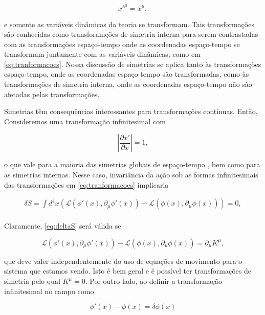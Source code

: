 \begin{equation}
x'^\mu = x^\mu , \label{eq:Xinvariante}
\end{equation}

e somente as variáveis dinâmicas da teoria se transformam. Tais transformações são conhecidas como transforamções de simetria interna para serem contrastadas com as transformações espaço-tempo onde as coordenadas espaço-tempo se transformam juntamente com as variáveis dinâmicas, como em \eqref{eq:tranformacoes}. Nossa discussão de simetrias se aplica tanto às transformações espaço-tempo, onde as coordenadas espaço-tempo são transformadas, como às transformações de simetria interna, onde as coordenadas espaço-tempo não são afetadas pelas transformações.

Simetrias têm consequências interessantes para transformações contínuas. Então, Consideremos uma transformação infinitesimal com

\begin{equation}
\left| \frac{\partial x'}{\partial x} \right| = 1, \label{eq:deXdevX}
\end{equation}

o que vale para a maioria das simetrias globais de espaço-tempo , bem como para as simetrias internas. Nesse caso, invariância da ação sob as formas infinitesimais das transformações em \eqref{eq:tranformacoes} implicaria

\begin{equation}
\begin{aligned}
\delta S = \int d^4 x ( \mathcal{L} (\phi' (x), \partial_\mu \phi' (x)) - \mathcal{L} (\phi (x), \partial_\mu \phi (x)) ) = 0, \\ \label{eq:deltaS}
\end{aligned}
\end{equation}

Claramente, \eqref{eq:deltaS} será válida se 

\begin{equation}
\mathcal{L} (\phi'(x), \partial_\mu \phi'(x)) - \mathcal{L} (\phi(x), \partial_\mu \phi(x)) = \partial_\mu K^\mu, \label{eq:deltaL1}
\end{equation}

que deve valer independentemente do uso de equações de movimento para o sistema que estamos vendo. Isto é bem geral e é possível ter transformações de simetria pelo qual $K^\mu = 0$.
Por outro lado, ao definir a transformação infinitesimal no campo como

\begin{equation}
\phi'(x) - \phi(x) = \delta \phi (x) \label{eq:transformacaocampo}
\end{equation}

